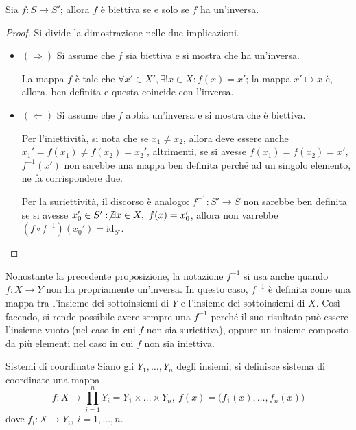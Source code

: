 \documentclass[11pt, a4paper]{scrartcl}
\theoremstyle{definition}
\numberwithin{esempio}{section}
\theoremstyle{definition}
\numberwithin{obs}{section}
\numberwithin{nota}{section}
\numberwithin{equation}{subsection}
\begin{document}
\begin{prop}
	{}{}
	Sia $f:S \to S'$; allora $f$ \`e biettiva se e solo se $f$ ha un'inversa.
	\begin{proof}
		Si divide la dimostrazione nelle due implicazioni.
		\begin{itemize}
			\item $(\Rightarrow )$ Si assume che $f$ sia biettiva e si mostra che ha un'inversa.

				La mappa $f$ \`e tale che $\forall x' \in X', \exists ! x \in X : f(x) = x'$; la mappa $x' \mapsto x$ \`e, allora, ben definita e questa coincide con l'inversa.
			\item $(\Leftarrow)$ Si assume che $f$ abbia un'inversa e si mostra che \`e biettiva.

				Per l'iniettivit\`a, si nota che se $x_1\neq x_2 $, allora deve essere anche $x_1' = f(x_1) \neq f(x_2) = x_2'$, altrimenti, se si avesse $f(x_1) = f(x_2) = x'$, $f^{-1} (x')$ non sarebbe una mappa ben definita perch\'e ad un singolo elemento, ne fa corrispondere due.

				Per la suriettivit\`a, il discorso \`e analogo: $f^{-1} :S'\to S$ non sarebbe ben definita se si avesse $x_0' \in S' : \not \exists x \in X , \ f(x) = x_0'$, allora non varrebbe $(f\circ f^{-1} ) (x_0') = \mathrm{id}_{S'}  $.
		\end{itemize}
	\end{proof}
\end{prop}
\noindent Nonostante la precedente proposizione, la notazione $f^{-1} $ si usa anche quando $f:X \to Y$ non ha propriamente un'inversa.
In questo caso, $f^{-1} $ \`e definita come una mappa tra l'insieme dei sottoinsiemi di $Y$ e l'insieme dei sottoinsiemi di $X$.
Cos\`i facendo, si rende possibile avere sempre una $f^{-1} $ perch\'e il suo risultato pu\`o essere l'insieme vuoto (nel caso in cui $f$ non sia suriettiva), oppure un insieme composto da pi\`u elementi nel caso in cui $f$ non sia iniettiva.
\begin{definizione}
	{Sistemi di coordinate}{}
	Siano gli $Y_1,\ldots, Y_n$ degli insiemi; si definisce sistema di coordinate una mappa 
	\[
	f: X \to \prod _{i=1} ^n Y_i = Y_1 \times \ldots \times Y_n, \ f(x) = \big(f_1(x), \ldots, f_n(x)\big)
	\] 
dove $f_i :X \to Y_i, \ i=1, \ldots, n$.
\end{definizione}
\end{document}
